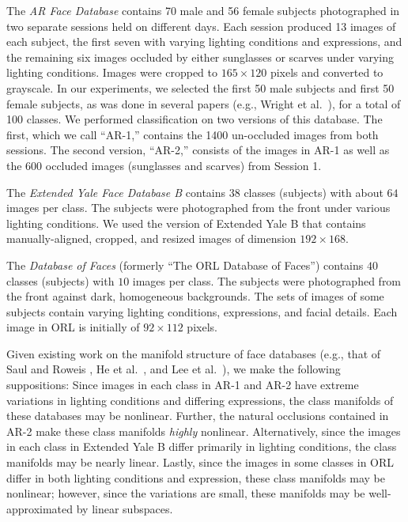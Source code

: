 \documentclass[review]{elsarticle}
\begin{document}
The \emph{AR Face Database} \cite{AR:face} contains 70 male and 56 female subjects photographed in two separate sessions held on different days. Each session produced 13 images of each subject, the first seven with varying lighting conditions and expressions, and the remaining six images occluded by either sunglasses or scarves under varying lighting conditions. Images were cropped to $165 \times 120$ pixels and converted to grayscale. In our experiments, we selected the first 50 male subjects and first 50 female subjects, as was done in several papers (e.g., Wright et al.\ \cite{wri:src}), for a total of 100 classes. We performed classification on two versions of this database. The first, which we call ``AR-1,'' contains the 1400 un-occluded images from both sessions. The second version, ``AR-2,'' consists of the images in AR-1 as well as the 600 occluded images (sunglasses and scarves) from Session 1.

The \emph{Extended Yale Face Database B} \cite{geo:illum} contains $38$ classes (subjects) with about $64$ images per class. The subjects were photographed from the front under various lighting conditions. We used the version of Extended Yale B that contains manually-aligned, cropped, and resized images of dimension $192 \times 168$. 


The \emph{Database of Faces} (formerly ``The ORL Database of Faces'') \cite{att:orl} contains $40$ classes (subjects) with $10$ images per class. The subjects were photographed from the front against dark, homogeneous backgrounds. The sets of images of some subjects contain varying lighting conditions, expressions, and facial details. Each image in ORL is initially of $92 \times 112$ pixels. 


Given existing work on the manifold structure of face databases (e.g., that of Saul and Roweis \cite{row:lle}, He et al.\ \cite{he:lapface}, and Lee et al.\ \cite{lee:linss}), we make the following suppositions: Since images in each class in AR-1 and AR-2 have extreme variations in lighting conditions and differing expressions, the class manifolds of these databases may be nonlinear. Further, the natural occlusions contained in AR-2 make these class manifolds \emph{highly} nonlinear. Alternatively, since the images in each class in Extended Yale B differ primarily in lighting conditions, the class manifolds may be nearly linear. Lastly, since the images in some classes in ORL differ in both lighting conditions and expression, these class manifolds may be nonlinear; however, since the variations are small, these manifolds may be well-approximated by linear subspaces.
\end{document}
